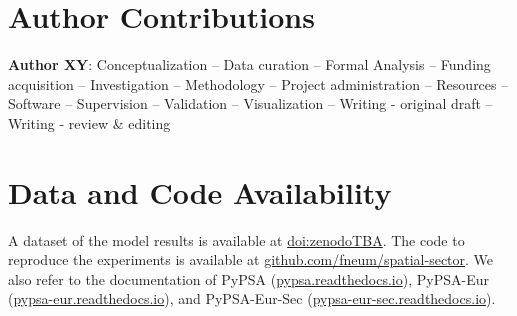 \documentclass[11pt,1p]{elsarticle}
\begin{document}
\section*{Author Contributions}


\textbf{Author XY}:
Conceptualization --
Data curation --
Formal Analysis --
Funding acquisition --
Investigation --
Methodology --
Project administration --
Resources --
Software --
Supervision --
Validation --
Visualization --
Writing - original draft --
Writing - review \& editing


\section*{Data and Code Availability}

A dataset of the model results is available at \href{zenodoTBA}{doi:zenodoTBA}.
The code to reproduce the experiments is available at \href{https://github.com/fneum/spatial-sector}{github.com/fneum/spatial-sector}.
We also refer to the documentation of PyPSA (\href{https://pypsa.readthedocs.io}{pypsa.readthedocs.io}),
PyPSA-Eur (\href{https://pypsa-eur.readthedocs.io}{pypsa-eur.readthedocs.io}), and
PyPSA-Eur-Sec (\href{https://pypsa-eur-sec.readthedocs.io}{pypsa-eur-sec.readthedocs.io}).

\renewcommand{\ttdefault}{\sfdefault}
%



\newpage

\makeatletter
\renewcommand \thesection{S\@arabic\c@section}
\renewcommand\thetable{S\@arabic\c@table}
\renewcommand \thefigure{S\@arabic\c@figure}
\makeatother

\renewcommand{\citenumfont}[1]{S#1}

\setcounter{equation}{0}
\setcounter{figure}{0}
\setcounter{table}{0}
\setcounter{section}{0}



\renewcommand{\ttdefault}{\sfdefault}
\end{document}
